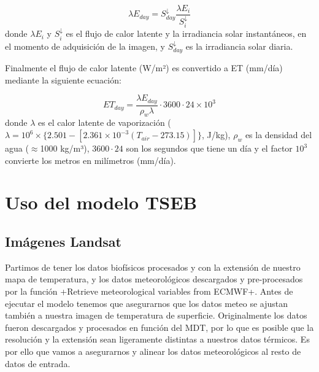 \documentclass[a4paper,11pt]{article}
\begin{document}
   \begin{equation}\label{eq:et}
    \lambda E_{day} = S^\downarrow_{day} \frac{\lambda E_{i}}{S^\downarrow_{i}}
   \end{equation}
   donde $\lambda E_{i}$ y $S^\downarrow_{i}$ es el flujo de calor latente y la irradiancia solar instantáneos, en el momento de adquisición de la imagen, y $S^\downarrow_{day}$ es la irradiancia solar diaria.
   
   Finalmente el flujo de calor latente (W/m²) es convertido a ET (mm/día) mediante la siguiente ecuación:
   
    \begin{equation}\label{eq:et}
    ET_{day} = \frac{\lambda E_{day}}{\rho_w \lambda} \cdot 3600 \cdot 24 \times 10^3
   \end{equation}
   donde $\lambda$ es el calor latente de vaporización ($\lambda = 10^6 \times \{2.501 - \left[2.361 \times 10^{-3} \left(T_{air} - 273.15\right)\right]\}$, J/kg), $\rho_w$ es la densidad del agua ($\approx$1000 kg/m³), $3600 \cdot 24$ son los segundos que tiene un día y el factor $10^3$ convierte los metros en milímetros (mm/día).
   
 \section{Uso del modelo TSEB}
  \subsection{Imágenes Landsat}
   Partimos de tener los datos biofísicos procesados y con la extensión de nuestro mapa de temperatura, y los datos meteorológicos descargados y pre-procesados por la función \cverb+Retrieve meteorological variables from ECMWF+. Antes de ejecutar el modelo tenemos que asegurarnos que los datos meteo se ajustan también a nuestra imagen de temperatura de superficie. Originalmente los datos fueron descargados y procesados en función del MDT, por lo que es posible que la resolución y la extensión sean ligeramente distintas a nuestros datos térmicos. Es por ello que vamos a asegurarnos y alinear los datos meteorológicos al resto de datos de entrada.
   
\end{document}
